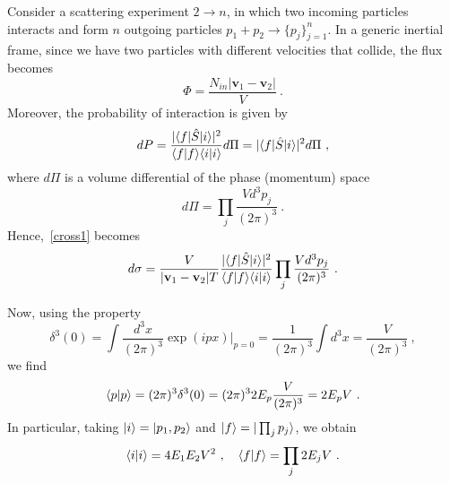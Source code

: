     Consider a scattering experiment $2 \rightarrow n$, in which two incoming particles interacts and form $n$ outgoing particles $p_1 + p_2 \rightarrow \{p_j\}_{j=1}^{n}$. In a generic inertial frame, since we have two particles with different velocities that collide, the flux becomes
    \begin{equation*}
        \Phi = \frac{N_{in} |\mathbf v_1 - \mathbf v_2|}{V} ~.
    \end{equation*}
    Moreover, the probability of interaction is given by 
    \begin{equation*}
        dP = \frac{|\langle f\vert \hat S \vert i\rangle|^2}{\langle f\vert f\rangle \langle i\vert i\rangle} d \Pi = |\langle f\vert \hat S \vert i\rangle|^2 d\Pi ~,
    \end{equation*}
    where $d\Pi$ is a volume differential of the phase (momentum) space
    \begin{equation*}
        d \Pi = \prod_j \frac{V d^3 p_j}{(2\pi)^3} ~.
    \end{equation*}
    Hence,~\eqref{cross1} becomes 
    \begin{equation}\label{proof1}
        d \sigma = \frac{V}{|\mathbf v_1 - \mathbf v_2| T} \frac{|\langle f\vert \hat S \vert i\rangle|^2}{\langle f\vert f\rangle \langle i\vert i\rangle} \prod_j \frac{V d^3 p_j}{(2\pi)^3} ~.
    \end{equation}

    Now, using the property 
    \begin{equation*}
        \delta^3 (0) = \int \frac{d^3 x}{(2\pi)^3} \exp(i p x) \Big \vert_{p=0} = \frac{1}{(2\pi)^3} \int d^3 x = \frac{V}{(2\pi)^3} ~,
    \end{equation*}
    we find
    \begin{equation*}
        \langle p\vert p\rangle = (2\pi)^3 \delta^3 (0) = (2\pi)^3 2 E_p \frac{V}{(2\pi)^3} = 2 E_p V ~.
    \end{equation*}
    In particular, taking $\vert i\rangle = \vert p_1, p_2\rangle$ and $\vert f\rangle = \vert\prod_j p_j\rangle$, we obtain 
    \begin{equation}\label{proof2}
        \langle i\vert i\rangle = 4 E_1 E_2 V^2 ~, \quad \langle f\vert f\rangle = \prod_j 2 E_j V ~.
    \end{equation}

